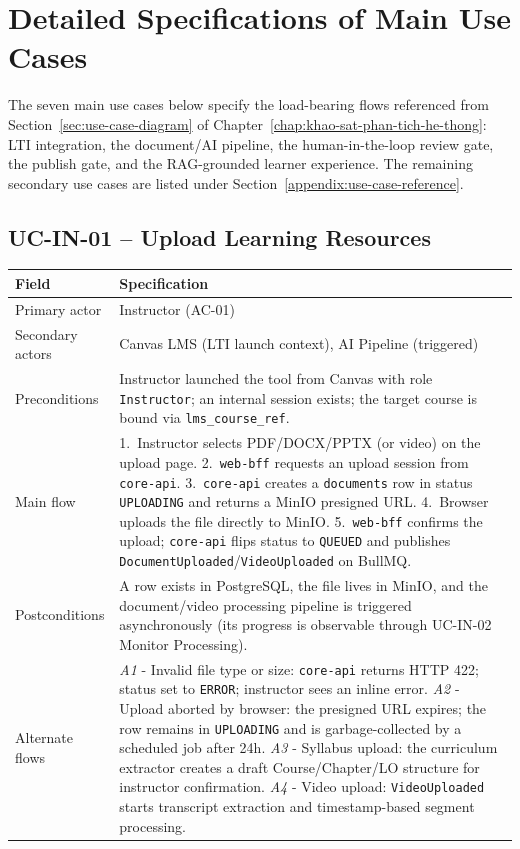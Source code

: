 \section{Detailed Specifications of Main Use Cases}
\label{appendix:main-use-case-reference}

The seven main use cases below specify the load-bearing flows referenced
from Section~\ref{sec:use-case-diagram} of
Chapter~\ref{chap:khao-sat-phan-tich-he-thong}: LTI integration, the
document/AI pipeline, the human-in-the-loop review gate, the publish
gate, and the RAG-grounded learner experience. The remaining secondary
use cases are listed under
Section~\ref{appendix:use-case-reference}.

\subsection*{UC-IN-01 -- Upload Learning Resources}

\begin{longtable}{|p{3.2cm}|p{10.3cm}|}
\hline
\textbf{Field} & \textbf{Specification} \\
\hline
\endhead
Primary actor & Instructor (AC-01) \\
\hline
Secondary actors & Canvas LMS (LTI launch context), AI Pipeline (triggered) \\
\hline
Preconditions & Instructor launched the tool from Canvas with role
    \texttt{Instructor}; an internal session exists; the target course
    is bound via \texttt{lms\_course\_ref}. \\
\hline
Main flow &
    1.\ Instructor selects PDF/DOCX/PPTX (or video) on the upload page.
    2.\ \texttt{web-bff} requests an upload session from \texttt{core-api}.
    3.\ \texttt{core-api} creates a \texttt{documents} row in status
    \texttt{UPLOADING} and returns a MinIO presigned URL.
    4.\ Browser uploads the file directly to MinIO.
    5.\ \texttt{web-bff} confirms the upload; \texttt{core-api} flips
    status to \texttt{QUEUED} and publishes
    \texttt{DocumentUploaded}/\texttt{VideoUploaded} on BullMQ. \\
\hline
Postconditions & A row exists in PostgreSQL, the file lives in MinIO,
    and the document/video processing pipeline is triggered
    asynchronously (its progress is observable through UC-IN-02
    Monitor Processing). \\
\hline
Alternate flows &
    \emph{A1} - Invalid file type or size: \texttt{core-api} returns
    HTTP 422; status set to \texttt{ERROR}; instructor sees an inline
    error.
    \emph{A2} - Upload aborted by browser: the presigned URL expires;
    the row remains in \texttt{UPLOADING} and is garbage-collected by a
    scheduled job after 24h.
    \emph{A3} - Syllabus upload: the curriculum extractor creates a
    draft Course/Chapter/LO structure for instructor confirmation.
    \emph{A4} - Video upload: \texttt{VideoUploaded} starts transcript
    extraction and timestamp-based segment processing. \\
\hline
\end{longtable}

